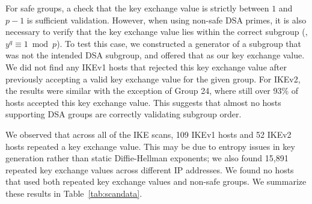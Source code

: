 For safe groups, a check that the key exchange value is strictly between $1$
and $p-1$ is sufficient validation. However, when using non-safe DSA primes, it
is also necessary to verify that the key exchange value lies within the correct
subgroup (\ie, $y^q \equiv 1 \bmod p$). To test this case, we constructed a
generator of a subgroup that was not the intended DSA subgroup, and offered
that as our key exchange value. We did not find any IKEv1 hosts that rejected
this key exchange value after previously accepting a valid key exchange value
for the given group. For IKEv2, the results were similar with the exception of
Group 24, where still over 93\% of hosts accepted this key exchange value. This
suggests that almost no hosts supporting DSA groups are correctly validating
subgroup order. 

We observed that across all of the IKE scans, 109 IKEv1 hosts and 52 IKEv2
hosts repeated a key exchange value. This may be due to entropy issues in key
generation rather than static Diffie-Hellman exponents; we also found 15,891
repeated key exchange values across different IP addresses. We found no hosts
that used both repeated key exchange values and non-safe groups. We summarize
these results in Table~\ref{tab:scandata}. 




